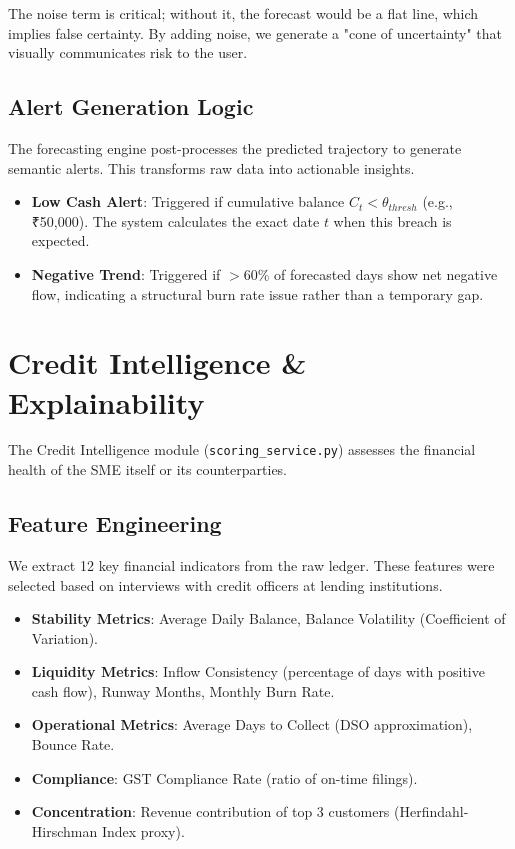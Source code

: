 \documentclass[conference]{IEEEtran}
\begin{document}
The noise term is critical; without it, the forecast would be a flat line, which implies false certainty. By adding noise, we generate a "cone of uncertainty" that visually communicates risk to the user.

\subsection{Alert Generation Logic}
The forecasting engine post-processes the predicted trajectory to generate semantic alerts. This transforms raw data into actionable insights.
\begin{itemize}
    \item \textbf{Low Cash Alert}: Triggered if cumulative balance $C_t < \theta_{thresh}$ (e.g., ₹50,000). The system calculates the exact date $t$ when this breach is expected.
    \item \textbf{Negative Trend}: Triggered if $>60\%$ of forecasted days show net negative flow, indicating a structural burn rate issue rather than a temporary gap.
\end{itemize}

\section{Credit Intelligence \& Explainability}

The Credit Intelligence module (\texttt{scoring\_service.py}) assesses the financial health of the SME itself or its counterparties.

\subsection{Feature Engineering}
We extract 12 key financial indicators from the raw ledger. These features were selected based on interviews with credit officers at lending institutions.
\begin{itemize}
    \item \textbf{Stability Metrics}: Average Daily Balance, Balance Volatility (Coefficient of Variation).
    \item \textbf{Liquidity Metrics}: Inflow Consistency (percentage of days with positive cash flow), Runway Months, Monthly Burn Rate.
    \item \textbf{Operational Metrics}: Average Days to Collect (DSO approximation), Bounce Rate.
    \item \textbf{Compliance}: GST Compliance Rate (ratio of on-time filings).
    \item \textbf{Concentration}: Revenue contribution of top 3 customers (Herfindahl-Hirschman Index proxy).
\end{itemize}
\end{document}
